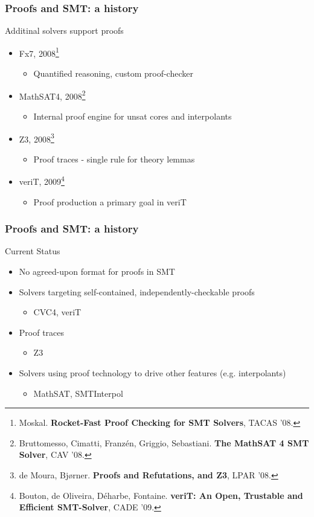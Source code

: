 \documentclass[svgnames,table,mathserif]{beamer}
\begin{document}
\begin{frame}\frametitle{Proofs and SMT: a history}

\begin{block}{Additinal solvers support proofs}
\begin{itemize}
\item Fx7, 2008\footnote{\tiny Moskal. {\bf Rocket-Fast Proof Checking for SMT
    Solvers}, TACAS '08.}
\begin{itemize}
\item Quantified reasoning, custom proof-checker
\end{itemize}
\item MathSAT4, 2008\footnote{\tiny Bruttomesso, Cimatti, Franz\'{e}n, Griggio,
  Sebastiani. {\bf The MathSAT 4 SMT Solver}, CAV '08.}
\begin{itemize}
\item Internal proof engine for unsat cores and interpolants
\end{itemize}
\item Z3, 2008\footnote{\tiny de Moura, Bj{\o}rner. {\bf Proofs and
    Refutations, and Z3}, LPAR '08.}
\begin{itemize}
\item Proof traces - single rule for theory lemmas
\end{itemize}
\item veriT, 2009\footnote{\tiny Bouton, de Oliveira, D\'{e}harbe,
  Fontaine. {\bf veriT: An Open, Trustable and Efficient SMT-Solver}, CADE
  '09.}
\begin{itemize}
\item Proof production a primary goal in veriT
\end{itemize}
\end{itemize}
\end{block}

\end{frame}

\begin{frame}\frametitle{Proofs and SMT: a history}

\begin{block}{Current Status}
\begin{itemize}
\item No agreed-upon format for proofs in SMT
\item Solvers targeting self-contained, independently-checkable proofs
\begin{itemize}
\item CVC4, veriT
\end{itemize}
\item Proof traces
\begin{itemize}
\item Z3
\end{itemize}
\item Solvers using proof technology to drive other features
  (e.g. interpolants)
\begin{itemize}
\item MathSAT, SMTInterpol
\end{itemize}
\end{itemize}
\end{block}

\end{frame}
\end{document}
